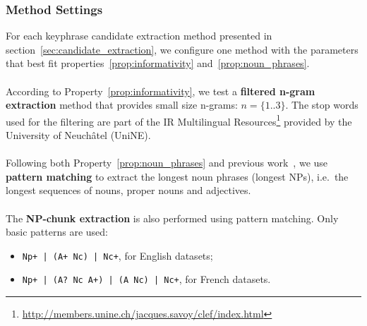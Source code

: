     \subsubsection{Method Settings}
    \label{subsubsec:method_settings}
      For each keyphrase candidate extraction method presented in
      section~\ref{sec:candidate_extraction}, we configure one method with the
      parameters that best fit properties~\ref{prop:informativity}
      and~\ref{prop:noun_phrases}.

      \paragraph{}
      According to Property~\ref{prop:informativity}, we test a \textbf{filtered
      n-gram extraction} method that provides small size n-grams:
      $n = \{1..3\}$. The stop words used for the filtering are part of the IR
      Multilingual
      Resources\footnote{\url{http://members.unine.ch/jacques.savoy/clef/index.html}}
      provided by the University of Neuchâtel (UniNE).

      \paragraph{}
      Following both Property~\ref{prop:noun_phrases} and previous
      work~\cite{hassan2010conundrums}, we use \textbf{pattern matching} to
      extract the longest noun phrases (longest NPs), i.e.~the longest sequences
      of nouns, proper nouns and adjectives.

      \paragraph{}
      The \textbf{NP-chunk extraction} is also performed using pattern matching.
      Only basic patterns are used:
      \begin{itemize}
        \item{\verb:Np+ | (A+ Nc) | Nc+:, for English datasets;}
        \item{\verb:Np+ | (A? Nc A+) | (A Nc) | Nc+:, for French datasets.}
      \end{itemize}


